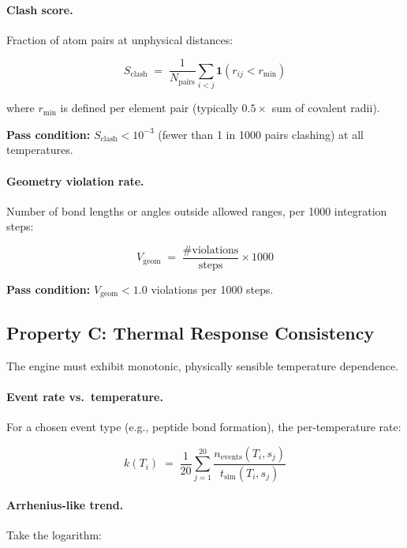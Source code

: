 \documentclass[11pt]{article}
\begin{document}
\paragraph{Clash score.} Fraction of atom pairs at unphysical distances:

\begin{equation}
\label{eq:clash}
S_{\mathrm{clash}} \;=\;
\frac{1}{N_{\mathrm{pairs}}}
\sum_{i < j} \mathbf{1}(r_{ij} < r_{\mathrm{min}})
\end{equation}

where $r_{\mathrm{min}}$ is defined per element pair (typically
$0.5\times$ sum of covalent radii).

\textbf{Pass condition:} $S_{\mathrm{clash}} < 10^{-3}$ (fewer than 1 in
1000 pairs clashing) at all temperatures.

\paragraph{Geometry violation rate.} Number of bond lengths or angles
outside allowed ranges, per 1000 integration steps:

\begin{equation}
V_{\mathrm{geom}} \;=\; \frac{\text{\# violations}}{\text{steps}} \times 1000
\end{equation}

\textbf{Pass condition:} $V_{\mathrm{geom}} < 1.0$ violations per 1000
steps.

\subsection{Property C: Thermal Response Consistency}

The engine must exhibit monotonic, physically sensible temperature
dependence.

\paragraph{Event rate vs.\ temperature.} For a chosen event type (e.g.,
peptide bond formation), the per-temperature rate:

\begin{equation}
k(T_i) \;=\;
\frac{1}{20}\sum_{j=1}^{20}
\frac{n_{\mathrm{events}}(T_i, s_j)}{t_{\mathrm{sim}}(T_i, s_j)}
\end{equation}

\paragraph{Arrhenius-like trend.} Take the logarithm:
\end{document}

